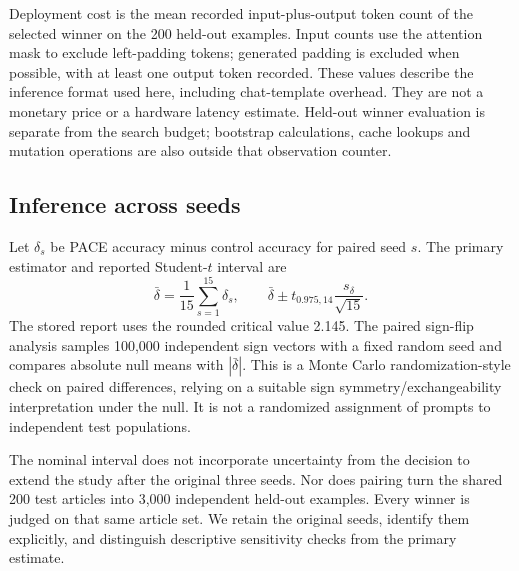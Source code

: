 Deployment cost is the mean recorded input-plus-output token count of the selected
winner on the 200 held-out examples. Input counts use the attention mask to exclude
left-padding tokens; generated padding is excluded when possible, with at least
one output token recorded. These values describe the inference format used here,
including chat-template overhead. They are not a monetary price or a hardware
latency estimate. Held-out winner evaluation is separate from the search budget;
bootstrap calculations, cache lookups and mutation operations are also outside
that observation counter.

\subsection{Inference across seeds}
Let $\delta_s$ be PACE accuracy minus control accuracy for paired seed $s$.
The primary estimator and reported Student-$t$ interval are
\begin{equation}
 \bar\delta=\frac{1}{15}\sum_{s=1}^{15}\delta_s,\qquad
 \bar\delta\pm t_{0.975,14}\frac{s_\delta}{\sqrt{15}}.
 \label{eq:seed-interval}
\end{equation}
The stored report uses the rounded critical value 2.145. The paired sign-flip
analysis samples 100,000 independent sign vectors with a fixed random seed and
compares absolute null means with $|\bar\delta|$. This is a Monte Carlo
randomization-style check on paired differences, relying on a suitable sign
symmetry/exchangeability interpretation under the null. It is not a randomized
assignment of prompts to independent test populations.

The nominal interval does not incorporate uncertainty from the decision to extend
the study after the original three seeds. Nor does pairing turn the shared 200
test articles into 3,000 independent held-out examples. Every winner is judged
on that same article set. We retain the original seeds, identify them explicitly,
and distinguish descriptive sensitivity checks from the primary estimate.
